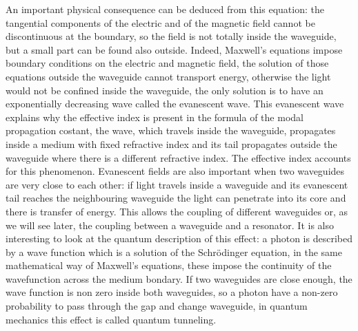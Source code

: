 An important physical consequence can be deduced from this equation: the tangential components of the electric and of the magnetic field cannot be discontinuous at the boundary, so the field is not totally inside the waveguide, but a small part can be found also outside. Indeed, Maxwell's equations impose boundary conditions on the electric and magnetic field, the solution of those equations outside the waveguide cannot transport energy, otherwise the light would not be confined inside the waveguide, the only solution is to have an exponentially decreasing wave called the evanescent wave. This evanescent wave explains why the effective index is present in the formula of the modal propagation costant, the wave, which travels inside the waveguide, propagates inside a medium with fixed refractive index and its tail propagates outside the waveguide where there is a different refractive index. The effective index accounts for this phenomenon.
Evanescent fields are also important when two waveguides are very close to each other: if light travels inside a waveguide and its evanescent tail reaches the neighbouring waveguide the light can penetrate into its core and there is transfer of energy. This allows the coupling of different waveguides or, as we will see later, the coupling between a waveguide and a resonator. It is also interesting to look at the quantum description of this effect: a photon is described by a wave function which is a solution of the Schr{\"o}dinger equation, in the same mathematical way of Maxwell's equations, these impose the continuity of the wavefunction across the medium bondary. If two waveguides are close enough, the wave function is non zero inside both waveguides, so a photon have a non-zero probability to pass through the gap and change waveguide, in quantum mechanics this effect is called quantum tunneling. 
